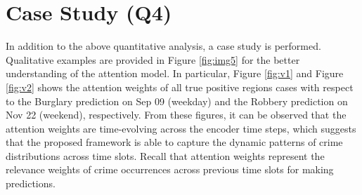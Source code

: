 \newpage
\section{Case Study (Q4)}

In addition to the above quantitative analysis, a case study is performed. 
Qualitative examples are provided in Figure \ref{fig:img5} for the better understanding 
of the attention model. In particular, Figure \ref{fig:v1} and Figure \ref{fig:v2} 
shows the attention weights of all true positive regions cases with 
respect to the Burglary  prediction on Sep 09 (weekday) and the 
Robbery prediction on Nov 22 (weekend), respectively. From these figures, 
it can be observed 
that the attention weights are time-evolving across the encoder
time steps, which suggests that the proposed framework is able to capture
the dynamic patterns of crime distributions across time slots. Recall
that attention weights represent the relevance weights of crime
occurrences across previous time slots for making predictions.

